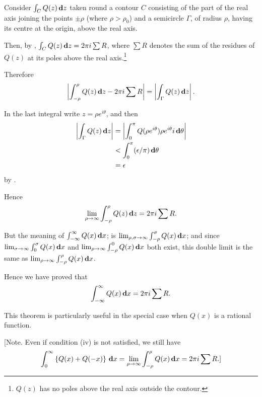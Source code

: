 Consider $\int_{C} Q(z) \, \mathbf{d} z$ taken round a contour $C$
consisting of the part of the real axis joining the points $\pm\rho$
(where $\rho > \rho_{0}$) and a semicircle $\Gamma$, of radius $\rho$,
having its centre at the origin, above the real axis.

Then, by , $\int_{C} Q(z) \, \mathbf{d} z = 2 \pi i
\sum R$, where $\sum R$ denotes the sum of the residues of $Q(z)$ at
its poles above the real axis.\footnote{$Q(z)$ has no poles above the
  real axis outside the contour.}

%
%
Therefore
$$
\left| 
  \int_{-\rho}^{\rho} Q(z) \, \mathbf{d} z
  -
  2 \pi i \sum R
 \right|
=
\left| 
  \int_{\Gamma} Q(z) \, \mathbf{d} z
 \right|.
$$

In the last integral write $z = \rho e^{i\theta}$, and then
\begin{align*}
  \left|  \int_{\Gamma} Q(z) \, \mathbf{d} z   \right|
  &=
  \left| 
    \int_{0}^{\pi} Q(\rho e^{i\theta}) \rho e^{i\theta} i
    \, \mathbf{d}\theta
   \right|
  \\
  &<
  \int_{0}^{\pi} (\epsilon / \pi) \, \mathbf{d} \theta
  \\
  &= \epsilon
\end{align*}
by .

Hence
$$
\lim_{\rho\rightarrow\infty}
\int_{-\rho}^{\rho} Q(z) \, \mathbf{d} z
=
2\pi i \sum R.
$$

But the meaning of $\int_{-\infty}^{\infty} Q(x) \, \mathbf{d} x$;
is $\lim_{\rho,\sigma\rightarrow\infty}\int_{-\rho}^{\sigma} Q(x)
\, \mathbf{d} x$;
and since
$\lim_{\sigma\rightarrow\infty}\int_{0}^{\sigma} Q(x) \, \mathbf{d} x$
and
$\lim_{\rho\rightarrow\infty}\int_{-\rho}^{0} Q(x) \, \mathbf{d} x$
both exist, this double limit is the same as
$\lim_{\rho\rightarrow\infty}\int_{-\rho}^{\rho} Q(x) \, \mathbf{d} x$.

Hence we have proved that
$$
\int_{-\infty}^{\infty} Q(x) \, \mathbf{d} x = 2\pi i \sum R.
$$

This theorem is particularly useful in the special case when $Q(x)$ is a
rational function.

[Note. Even if condition (iv) is not satisfied, we still have
$$
\int_{0}^{\infty}
\left\{ 
  Q(x) + Q(-x)
 \right\} \, \mathbf{d} x
=
\lim_{\rho\rightarrow\infty} \int_{-\rho}^{\rho} Q(x) \, \mathbf{d} x
= 2 \pi i \sum R.]
$$

